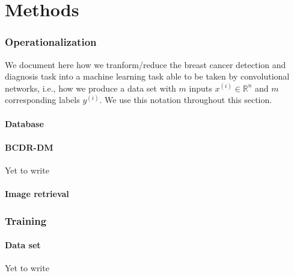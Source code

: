 \documentclass[11pt]{article}
\begin{document}
	\part{Methods}
	\section{Operationalization}
	We document here how we tranform/reduce the breast cancer detection and diagnosis task into a machine learning task able to be taken by convolutional networks, i.e., how we produce a data set with $m$ inputs $x^{(i)} \in \mathbb{R}^n$ and $m$ corresponding labels $y^{(i)}$. We use this notation throughout this section. 

	\subsection{Database}
	

	\subsection{BCDR-DM}
	Yet to write

	\subsection{Image retrieval}
	


	\section{Training}

	\subsection{Data set}
	Yet to write
\end{document}
